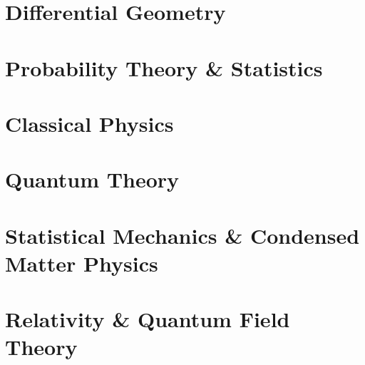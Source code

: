 \documentclass[12pt, a4paper]{report}
\begin{document}
\part{Differential Geometry}\label{part:diffgeom}

















\part{Probability Theory \& Statistics}








\part{Classical Physics}





\part{Quantum Theory}







\part{Statistical Mechanics \& Condensed Matter Physics}





\part{Relativity \& Quantum Field Theory}








\end{document}
